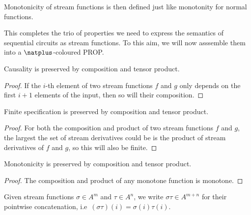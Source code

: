 Monotonicity of stream functions is then defined just like monotonity for normal
functions.

This completes the trio of properties we need to express the semantics of
sequential circuits as stream functions.
To this aim, we will now asssemble them into a \(\natplus\)-coloured PROP.

\begin{lemma}\label{lem:causality-preserved}
    Causality is preserved by composition and tensor product.
\end{lemma}
\begin{proof}
    If the \(i\)-th element of two stream functions \(f\) and \(g\) only depends
    on the first \(i+1\) elements of the input, then so will their composition.
\end{proof}

\begin{lemma}\label{lem:finitely-specified-preserved}
    Finite specification is preserved by composition and tensor product.
\end{lemma}
\begin{proof}
    For both the composition and product of two stream functions \(f\) and
    \(g\), the largest the set of stream derivatives could be is the product of
    stream derivatives of \(f\) and \(g\), so this will also be finite.
\end{proof}

\begin{lemma}\label{lem:monotonicity-preserved}
    Monotonicity is preserved by composition and tensor product.
\end{lemma}
\begin{proof}
    The composition and product of any monotone function is monotone.
\end{proof}

\begin{notation}
    Given stream functions \(\sigma \in A^m\) and \(\tau \in A^n\), we write
    \(\sigma\tau \in A^{m+n}\) for their pointwise concatenation, i.e\
    \((\sigma\tau)(i) = \sigma(i)\tau(i)\).
\end{notation}

